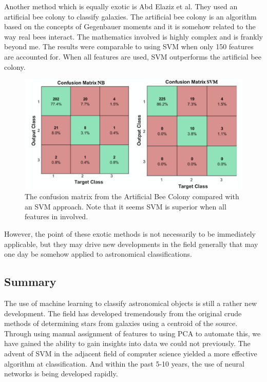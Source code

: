 \documentclass[a4paper,11pt]{article}
\begin{document}
Another method which is equally exotic is Abd Elaziz et al. They used an artificial bee colony to classify galaxies. \cite{abdelaziz_2018_galaxies} The artificial bee colony is an algorithm based on the concepts of Gegenbauer moments and it is somehow related to the way real bees interact. The mathematics involved is highly complex and is frankly beyond me. The results were comparable to using SVM when only 150 features are accounted for. When all features are used, SVM outperforms the artificial bee colony.

\begin{figure}[ht]
\centering
\includegraphics[width=\textwidth]{confusion_matrix.png}
\caption{\label{fig:CNNExample}The confusion matrix from the Artificial Bee Colony compared with an SVM approach. Note that it seems SVM is superior when all features in involved. \cite{abdelaziz_2018_galaxies}}
\end{figure}

However, the point of these exotic methods is not necessarily to be immediately applicable, but they may drive new developments in the field generally that may one day be somehow applied to astronomical classifications.

\subsection{Summary}
The use of machine learning to classify astronomical objects is still a rather new development. The field has developed tremendously from the original crude methods of determining stars from galaxies using a centroid of the source. Through using manual assignment of features to using PCA to automate this, we have gained the ability to gain insights into data we could not previously. The advent of SVM in the adjacent field of computer science yielded a more effective algorithm at classification. And within the past 5-10 years, the use of neural networks is being developed rapidly.
\end{document}
